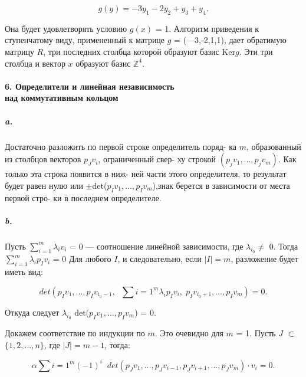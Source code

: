 {\begin{equation*}
g(y) = -3y_1 - 2y_2 + y_3 + y_4.
\end{equation*}

\noindent Она будет удовлетворять условию $g(x)$ = 1. Алгоритм приведения к ступенчатому виду, примененный к матрице $g$ = (—3,-2,1,1), дает обратимую матрицу $R$, три последних столбца которой образуют базис Ker{$g$}. Эти три столбца и вектор $x$ образуют базис $\mathbb {Z}^{4}$.




\paragraph{6. Определители и линейная независимость\\
над коммутативным кольцом}

\subparagraph{a.} Достаточно разложить по первой строке определитель поряд-
ка $m$, образованный из столбцов векторов $p_{J}v_{i}$, ограниченный свер-
ху строкой $(p_{j}v_{1},\ldots,p_{j}v_{m})$. Как только эта строка появится в ниж-
ней части этого определителя, то результат будет равен нулю или
$\pm$det($p_{I}v_{1},\ldots,p_{I}v_{m}$),знак берется в зависимости от места первой стро-
ки в последнем определителе.

\subparagraph{b.} Пусть $\sum_{i=1}^{m} \lambda_{i}v_{i}$ = 0 --- соотношение линейной зависимости, где
$\lambda_{i_0} \neq$ 0. Тогда $\sum_{i=1}^{m} \lambda_{i}p_{I}v_{i}$ = 0 Для любого $I$, и следовательно, если
$|I| = m$, разложение будет иметь вид:

\begin{equation*}
det(p_{I}v_1,\ldots,p_{I}v_{i_{0}-1},\;\;\sum\limits {i=1}^m \lambda_{i}p_{I}v_{i},\;p_{I}v_{i_{0}+1},\ldots,p_{I}v_{m}) = 0.
\end{equation*}

\noindent Откуда следует $\lambda_{i_0}$ det($p_{I}v_{1},\ldots,p_{I}v_{m}$) = 0.

Докажем соответствие по индукции по $m$. Это очевидно для $m$ = 1.
Пусть $J$ $\subset$ $\{1,2,\ldots,n\}$, где $|J| = m - 1$, тогда:

\setcounter{equation}{5}

\begin{equation}
\alpha \sum\limits {i=1}^m (-1)^{i}\;\;det(p_{J}v_{1},\ldots,p_{J}v_{i-1},p_{J}v_{i+1},\ldots,p_{J}v_{m}) \cdot v_{i} = 0.
\end{equation}

}

